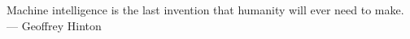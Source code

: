 \thispagestyle{empty}
{}

\vspace*{3cm}

\begin{center}
  Machine intelligence is the last invention that humanity will ever need to make. \\ \medskip
  --- Geoffrey Hinton

\end{center}
